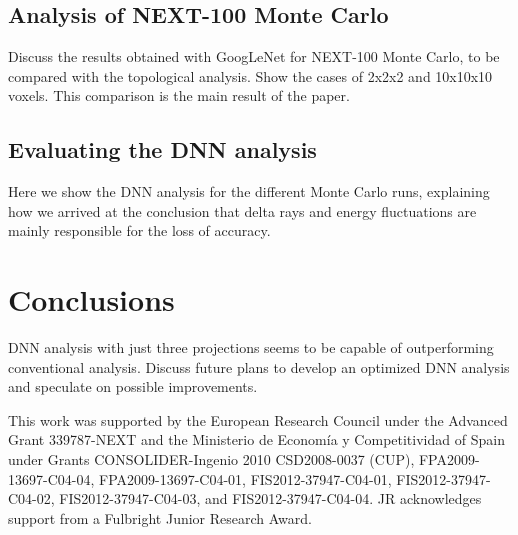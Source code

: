 \documentclass{JINST}
\begin{document}
\subsection{Analysis of NEXT-100 Monte Carlo}
Discuss the results obtained with GoogLeNet for NEXT-100 Monte Carlo, to be compared with the topological analysis.  Show the cases of 2x2x2 and 10x10x10 voxels.  This comparison is
the main result of the paper.

\subsection{Evaluating the DNN analysis}
Here we show the DNN analysis for the different Monte Carlo runs, explaining how we arrived at the conclusion that delta rays and energy fluctuations are mainly responsible for the
loss of accuracy.

\section{Conclusions}
DNN analysis with just three projections seems to be capable of outperforming conventional analysis.  Discuss future plans to develop an optimized DNN analysis and speculate
on possible improvements.



\acknowledgments

This work was supported by the European Research Council under the Advanced Grant 339787-NEXT and the Ministerio de Econom\'{i}a y Competitividad of Spain under Grants CONSOLIDER-Ingenio 2010 CSD2008-0037 (CUP), FPA2009-13697-C04-04, FPA2009-13697-C04-01, FIS2012-37947-C04-01, FIS2012-37947-C04-02, FIS2012-37947-C04-03, and FIS2012-37947-C04-04.  JR acknowledges support from a Fulbright Junior Research Award.


\end{document}
